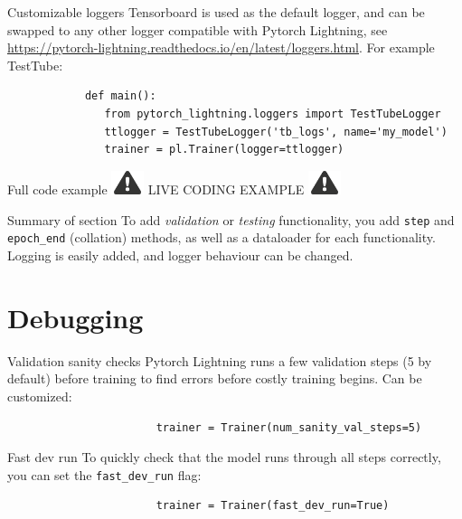 \documentclass[aspectratio=169]{beamer}
\newcommand{\alertsymb}{\includegraphics[height=0.7cm]{alert.png}}
\newcommand{\livecode}{\Large \centering \alertsymb \hspace{1em}
	LIVE CODING EXAMPLE \hspace{1em} \alertsymb}
\begin{document}
	\begin{frame}[fragile]{Customizable loggers}
		Tensorboard is used as the default logger, and can be swapped to any other logger compatible with Pytorch Lightning, see \url{https://pytorch-lightning.readthedocs.io/en/latest/loggers.html}. For example TestTube:
		
		\begin{verbatim}
			def main():
			   from pytorch_lightning.loggers import TestTubeLogger
			   ttlogger = TestTubeLogger('tb_logs', name='my_model')
			   trainer = pl.Trainer(logger=ttlogger)
		\end{verbatim}
	\end{frame}

	\begin{frame}{Full code example}
		\livecode
	\end{frame}

	\begin{frame}{Summary of section}
		To add \emph{validation} or \emph{testing} functionality, you add \texttt{step} and \texttt{epoch\_end} (collation) methods, as well as a dataloader for each functionality.
		\vfill
		Logging is easily added, and logger behaviour can be changed.
	\end{frame}

	\section{Debugging}

	\begin{frame}[fragile]{Validation sanity checks}
		Pytorch Lightning runs a few validation steps (5 by default) before training to find errors before costly training begins. Can be customized:
		\begin{verbatim}
					   trainer = Trainer(num_sanity_val_steps=5)
		\end{verbatim}
	\end{frame}

	\begin{frame}[fragile]{Fast dev run}
		To quickly check that the model runs through all steps correctly, you can set the \texttt{fast\_dev\_run} flag:

		\begin{verbatim}
					   trainer = Trainer(fast_dev_run=True)
		\end{verbatim}
	\end{frame}
\end{document}
